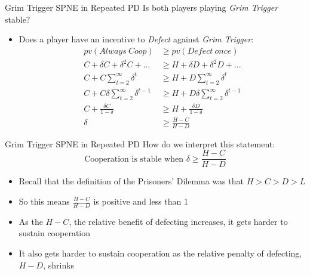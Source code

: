 \begin{frame}{Grim Trigger SPNE in Repeated PD}
  Is both players playing \textit{Grim Trigger} stable?
  \begin{itemize}
    \item Does a player have an incentive to \textit{Defect} against \textit{Grim Trigger}:
    \vspace{-5mm}
    \begin{align*}
      pv(Always~Coop) & \geq pv(Defect~once) \\
      C + \delta C + \delta^2 C + ...      & \geq H + \delta D + \delta^2 D + ...\\
      C + C \sum_{t=2}^{\infty} \delta^{t} & \geq H + D \sum_{t=2}^{\infty} \delta^{t} \\ 
      C + C \delta \sum_{t=2}^{\infty} \delta^{t-1} & \geq H + D \delta \sum_{t=2}^{\infty} \delta^{t-1} \\ 
      C + \frac{\delta C}{1 - \delta} & \geq H + \frac{\delta D}{1 - \delta} \\
      \delta & \geq \frac{H - C}{H - D}
    \end{align*}
  \end{itemize}
\end{frame}

\begin{frame}{Grim Trigger SPNE in Repeated PD}
  How do we interpret this statement:
  $$\text{Cooperation is stable when } \delta \geq \frac{H - C}{H - D}  $$ 
  \begin{itemize}
    \item Recall that the definition of the Prisoners' Dilemma was that $H > C > D > L$
    \item So this means $\frac{H - C}{H - D}$ is positive and less than 1 
    \item As the $H - C$, the relative benefit of defecting increases,
    it gets harder to sustain cooperation
    \item It also gets harder to sustain cooperation as the relative penalty of defecting, $H - D$, shrinks 
  \end{itemize}
\end{frame}

